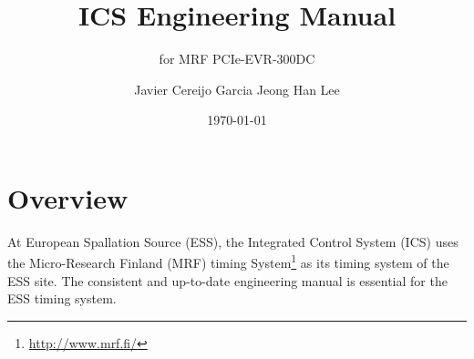 \documentclass[11pt
  , a4paper
  , article
  , oneside
  , showtrims
]{memoir}
\begin{document}
%

%

%
\date{\today}

%

%

%

%
\title{ICS Engineering Manual}
\subtitle{for MRF PCIe-EVR-300DC}
\author{Javier Cereijo Garcia \newline Jeong Han Lee}





\showtrimson

\esstitle
\newpage
\tableofcontents
\newpage



\chapter{Overview}
At European Spallation Source (ESS), the Integrated Control System (ICS) uses the Micro-Research Finland (MRF) timing System{\footnote{\url{http://www.mrf.fi/}}} as its timing system of the ESS site. The consistent and up-to-date engineering manual is essential for the ESS timing system.\\
\end{document}
